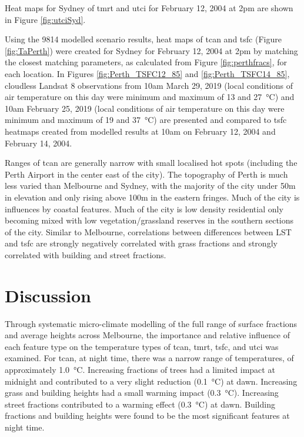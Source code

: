 \documentclass[final,3p,times,authoryear]{elsarticle}
\begin{document}
Heat maps for Sydney of \gls{tmrt} and \gls{utci} for February 12, 2004 at 2pm are shown in Figure \ref{fig:utciSyd}.



Using the 9814 modelled scenario results, heat maps of \gls{tcan} and \gls{tsfc} (Figure \ref{fig:TaPerth}) were created for Sydney for February 12, 2004 at 2pm by matching the closest matching parameters, as calculated from Figure \ref{fig:perthfracs}, for each location. In Figures \ref{fig:Perth_TSFC12_85} and \ref{fig:Perth_TSFC14_85}, cloudless Landsat 8 observations from 10am March 29, 2019 (local conditions of air temperature on this day were minimum and maximum of 13 and 27\SI{}{\degreeCelsius}) and 10am February 25, 2019 (local conditions of air temperature on this day were minimum and maximum of 19 and 37\SI{}{\degreeCelsius}) are presented and compared to \gls{tsfc} heatmaps created from modelled results at 10am on February 12, 2004 and February 14, 2004. 


Ranges of \gls{tcan} are generally narrow with small localised hot spots (including the Perth Airport in the center east of the city). The topography of Perth is much less varied than Melbourne and Sydney, with the majority of the city under 50m in elevation and only rising above 100m in the eastern fringes. Much of the city is influences by coastal features. Much of the city is low density residential only becoming mixed with low vegetation/grassland reserves in the southern sections of the city. Similar to Melbourne, correlations between differences between LST and \gls{tsfc} are strongly negatively correlated with grass fractions and strongly correlated with building and street fractions.








\section{Discussion}\label{sec:discussion}

Through systematic micro-climate modelling of the full range of surface fractions and average heights across Melbourne, the importance and relative influence of each feature type on the temperature types of \gls{tcan}, \gls{tmrt}, \gls{tsfc}, and \gls{utci} was examined. For \gls{tcan}, at night time, there was a narrow range of temperatures, of approximately 1.0\SI{}{\degreeCelsius}. Increasing fractions of trees had a limited impact at midnight and contributed to a very slight reduction (0.1\SI{}{\degreeCelsius}) at dawn. Increasing grass and building heights had a small warming impact (0.3\SI{}{\degreeCelsius}). Increasing street fractions contributed to a warming effect (0.3\SI{}{\degreeCelsius}) at dawn. Building fractions and building heights were found to be the most significant features at night time.
\end{document}

